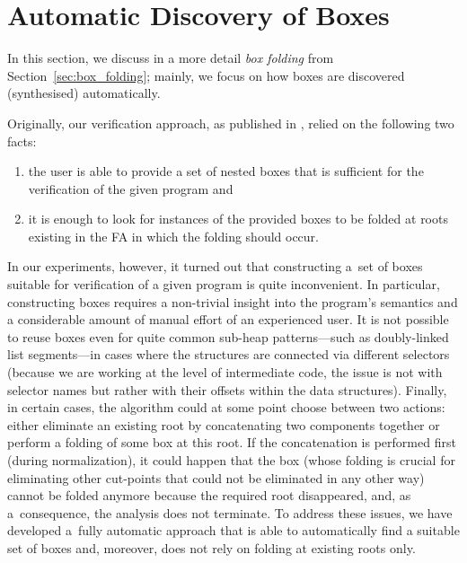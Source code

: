 
\section{Automatic Discovery of Boxes}\label{sec:box_discovery}

In this section, we discuss in a more detail \emph{box folding} from Section~\ref{sec:box_folding};
mainly, we focus on how boxes are discovered (synthesised) automatically.

Originally, our verification approach, as published in \cite{habermehl:forest}, relied
on the following two facts:
%
\begin{enumerate}
\item the user is able to provide a set of nested boxes that is sufficient for
  the verification of the given program and
\item it is enough to look for instances of the provided boxes to
  be folded at roots existing in the FA in which the folding should occur.
\end{enumerate}
%
In our experiments, however, it turned out that constructing a~set of boxes
suitable for verification of a given program is quite inconvenient.
In particular, constructing boxes requires a non-trivial insight into the program's semantics and a considerable amount of manual
effort of an experienced user. 
It is not possible to reuse boxes even for quite common sub-heap patterns---such as doubly-linked list
segments---in cases where the structures are connected via different selectors
(because we are working at the level of \gcc intermediate code, the
issue is not with selector names but rather with their offsets within the data
structures).
Finally, in certain cases, the algorithm could at some point
choose between two actions:
either eliminate an existing root by concatenating two components together
or perform a folding of some box at this root.
If the concatenation is performed first (during
normalization), it could happen that the box (whose folding is crucial for
eliminating other cut-points that could not be eliminated in any other way)
cannot be folded anymore because the required root disappeared, and, as
a~consequence, the analysis does not terminate.
To address these issues, we have developed a~fully automatic approach that is
able to automatically find a suitable set of boxes and, moreover, does not rely
on folding at existing roots only.

